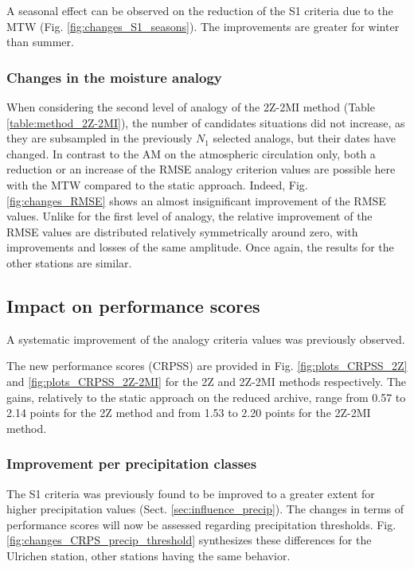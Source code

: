 \documentclass[hess, manuscript]{copernicus}
\begin{document}
A seasonal effect can be observed on the reduction of the S1 criteria due to the MTW (Fig. \ref{fig:changes_S1_seasons}). The improvements are greater for winter than summer. 


\subsubsection{Changes in the moisture analogy}

When considering the second level of analogy of the 2Z-2MI method (Table \ref{table:method_2Z-2MI}), the number of candidates situations did not increase, as they are subsampled in the previously $N_{1}$ selected analogs, but their dates have changed. In contrast to the AM on the atmospheric circulation only, both a reduction or an increase of the RMSE analogy criterion values are possible here with the MTW compared to the static approach. Indeed, Fig. \ref{fig:changes_RMSE} shows an almost insignificant improvement of the RMSE values. Unlike for the first level of analogy, the relative improvement of the RMSE values are distributed relatively symmetrically around zero, with improvements and losses of the same amplitude. Once again, the results for the other stations are similar.


\subsection{Impact on performance scores}
\label{sec:influence_scores}

A systematic improvement of the analogy criteria values was previously observed. 

The new performance scores (CRPSS) are provided in Fig. \ref{fig:plots_CRPSS_2Z} and \ref{fig:plots_CRPSS_2Z-2MI} for the 2Z and 2Z-2MI methods respectively. The gains, relatively to the static approach on the reduced archive, range from 0.57 to 2.14 points for the 2Z method and from 1.53 to 2.20 points for the 2Z-2MI method. 


\subsubsection{Improvement per precipitation classes}
\label{sec:improvement_CRPSS_precip_threshold}

The S1 criteria was previously found to be improved to a greater extent for higher precipitation values (Sect. \ref{sec:influence_precip}). The changes in terms of performance scores will now be assessed regarding precipitation thresholds. Fig. \ref{fig:changes_CRPS_precip_threshold} synthesizes these differences for the Ulrichen station, other stations having the same behavior.
\end{document}
